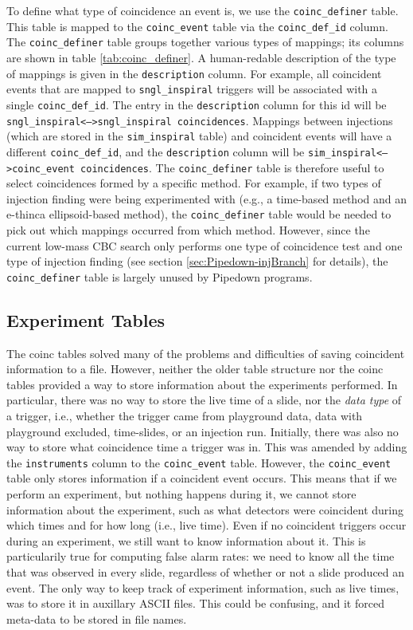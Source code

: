 To define what type of coincidence an event is, we use the
\texttt{coinc\_definer} table. This table is mapped to the
\texttt{coinc\_event} table via the \texttt{coinc\_def\_id} column. The
\texttt{coinc\_definer} table groups together various types of mappings; its
columns are shown in table \ref{tab:coinc_definer}. A human-redable description
of the type of mappings is given in the \texttt{description} column. For
example, all coincident events that are mapped to \texttt{sngl\_inspiral}
triggers will be associated with a single \texttt{coinc\_def\_id}. The entry in
the \texttt{description} column for this id will be
\texttt{sngl\_inspiral<-->sngl\_inspiral coincidences}. Mappings between
injections (which are stored in the \texttt{sim\_inspiral} table) and
coincident events will have a different \texttt{coinc\_def\_id}, and the
\texttt{description} column will be \texttt{sim\_inspiral<-->coinc\_event
coincidences}. The \texttt{coinc\_definer} table is therefore useful to select
coincidences formed by a specific method. For example, if two types of
injection finding were being experimented with (e.g., a time-based method and
an e-thinca ellipsoid-based method), the \texttt{coinc\_definer} table would be
needed to pick out which mappings occurred from which method. However, since
the current low-mass \ac{CBC} search only performs one type of coincidence test
and one type of injection finding (see section \ref{sec:Pipedown-injBranch} for
details), the \texttt{coinc\_definer} table is largely unused by Pipedown
programs.

\subsection{Experiment Tables}
\label{sec:experiment_tables}

The coinc tables solved many of the problems and difficulties of saving
coincident information to a file. However, neither the older table structure
nor the coinc tables provided a way to store information about the experiments
performed. In particular, there was no way to store the live time of a slide,
nor the \emph{data type} of a trigger, i.e., whether the trigger came from
playground data, data with playground excluded, time-slides, or an injection
run. Initially, there was also no way to store what coincidence time a trigger
was in. This was amended by adding the \texttt{instruments} column to the
\texttt{coinc\_event} table. However, the \texttt{coinc\_event} table only
stores information if a coincident event occurs. This means that if we perform
an experiment, but nothing happens during it, we cannot store information about
the experiment, such as what detectors were coincident during which times and
for how long (i.e., live time). Even if no coincident triggers occur during an
experiment, we still want to know information about it. This is particularily
true for computing false alarm rates: we need to know all the time that was
observed in every slide, regardless of whether or not a slide produced an
event. The only way to keep track of experiment information, such as live
times, was to store it in auxillary ASCII files. This could be confusing, and
it forced meta-data to be stored in file names.

